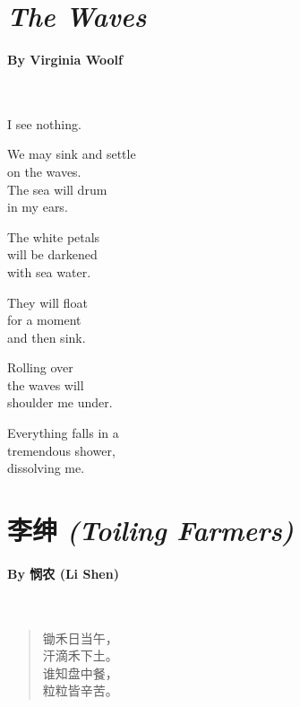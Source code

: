 \newpage
{}
\section*{\emph{The Waves}}
\paragraph{By Virginia Woolf}~

\vspace{1em}
\begin{minipage}{0.3\textwidth}
\begin{center}
	I see nothing.
	
	We may sink and settle\\
	on the waves.\\
	The sea will drum\\
	in my ears.
	
	The white petals\\
	will be darkened\\
	with sea water.
	
	They will float\\
	for a moment\\
	and then sink.
	
	Rolling over\\
	the waves will\\
	shoulder me under.
	
	Everything falls in a\\
	tremendous shower,\\
	dissolving me.
\end{center}
\end{minipage}

\newpage
\section*{{李绅} \emph{(Toiling Farmers)}}
\paragraph{By {悯农} (Li Shen)}~

{
\begin{verse}
	锄禾日当午，\\
	汗滴禾下土。\\
	谁知盘中餐，\\
	粒粒皆辛苦。
\end{verse}
}

